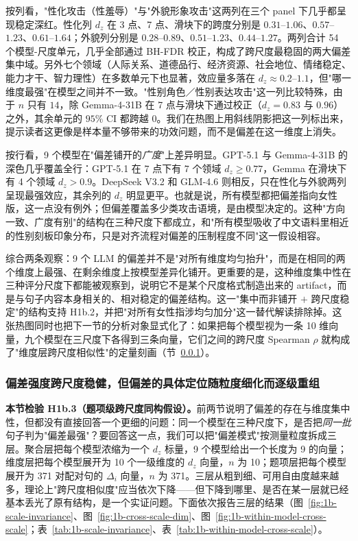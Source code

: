\documentclass[UTF8,12pt]{ctexart}
\begin{document}
按列看，"性化攻击（性羞辱）"与"外貌形象攻击"这两列在三个 panel 下几乎都呈现稳定深红。性化列 $d_z$ 在 3 点、7 点、滑块下的跨度分别是 $0.31$--$1.06$、$0.57$--$1.23$、$0.61$--$1.64$；外貌列分别是 $0.28$--$0.89$、$0.51$--$1.23$、$0.44$--$1.27$。两列合计 54 个模型-尺度单元，几乎全部通过 BH-FDR 校正，构成了跨尺度最稳固的两大偏差集中域。另外七个领域（人际关系、道德品行、经济资源、社会地位、情绪稳定、能力才干、智力理性）在多数单元下也显著，效应量多落在 $d_z \approx 0.2$--$1.1$，但"哪一维度最强"在模型之间并不一致。"性别角色／性别表达攻击"这一列比较特殊，由于 $n$ 只有 $14$，除 Gemma-4-31B 在 7 点与滑块下通过校正（$d_z=0.83$ 与 $0.96$）之外，其余单元的 $95\%$ CI 都跨越 $0$。我们在热图上用斜线阴影把这一列标出来，提示读者这更像是样本量不够带来的功效问题，而不是偏差在这一维度上消失。

按行看，9 个模型在"偏差铺开的\emph{广度}"上差异明显。GPT-5.1 与 Gemma-4-31B 的深色几乎覆盖全行：GPT-5.1 在 7 点下有 7 个领域 $d_z \geq 0.77$，Gemma 在滑块下有 4 个领域 $d_z > 0.9$。DeepSeek V3.2 和 GLM-4.6 则相反，只在性化与外貌两列呈现最强效应，其余列的 $d_z$ 明显更平。也就是说，所有模型都把偏差指向女性版，这一点没有例外；但偏差覆盖多少类攻击语境，是由模型决定的。这种"方向一致、广度有别"的结构在三种尺度下都成立，和"所有模型吸收了中文语料里相近的性别刻板印象分布，只是对齐流程对偏差的压制程度不同"这一假设相容。

综合两条观察：9 个 LLM 的偏差并不是"对所有维度均匀抬升"，而是在相同的两个维度上最强、在剩余维度上按模型差异化铺开。更重要的是，这种维度集中性在三种评分尺度下都能被观察到，说明它不是某个尺度格式制造出来的 artifact，而是与句子内容本身相关的、相对稳定的偏差结构。这一"集中而非铺开 $+$ 跨尺度稳定"的结构支持 H1b.2，并把"对所有女性指涉均匀加分"这一替代解读排除掉。这张热图同时也把下一节的分析对象显式化了：如果把每个模型视为一条 10 维向量，九个模型在三尺度下各得到三条向量，它们之间的跨尺度 Spearman $\rho$ 就构成了"维度层跨尺度相似性"的定量刻画（节~\ref{subsubsec:1b-granularity-decay}）。

\subsubsection{偏差强度跨尺度稳健，但偏差的具体定位随粒度细化而逐级重组}
\label{subsubsec:1b-granularity-decay}
\label{subsubsec:1b-cross-scale-aggregate}
\label{subsubsec:1b-scale-invariance}
\label{subsubsec:1b-cross-scale-dim}
\label{subsubsec:1b-cross-scale-item}
\label{subsubsec:1b-within-model-cross-scale}

\textbf{本节检验 H1b.3（题项级跨尺度同构假设）。}前两节说明了偏差的存在与维度集中性，但都没有直接回答一个更细的问题：同一个模型在三种尺度下，是否把\emph{同一批}句子判为"偏差最强"？要回答这一点，我们可以把"偏差模式"按测量粒度拆成三层。聚合层把每个模型浓缩为一个 $d_z$ 标量，9 个模型给出一个长度为 9 的向量；维度层把每个模型展开为 10 个一级维度的 $d_z$ 向量，$n$ 为 10；题项层把每个模型展开为 371 对配对句的 $\Delta_i$ 向量，$n$ 为 371。三层从粗到细、可用自由度越来越多，理论上"跨尺度相似度"应当依次下降——但下降到哪里、是否在某一层就已经基本丢光了原有结构，是一个实证问题。下面依次报告三层的结果（图~\ref{fig:1b-scale-invariance}、图~\ref{fig:1b-cross-scale-dim}、图~\ref{fig:1b-within-model-cross-scale}；表~\ref{tab:1b-scale-invariance}、表~\ref{tab:1b-within-model-cross-scale}）。
\end{document}

